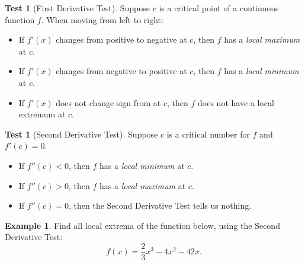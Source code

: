 \documentclass[oneside]{book}
\theoremstyle{definition}
\newtheorem{example}{Example}
\newtheorem{test}[definition]{Test}
\theoremstyle{solution}
\begin{document}
\begin{test}[First Derivative Test]
  Suppose $c$ is a critical point of a continuous function $f$. When
  moving from left to right:
  \begin{itemize}
  \item If $f'(x)$ changes from positive to negative at $c$, then $f$
    has a \emph{local maximum} at $c$.
  \item If $f'(x)$ changes from negative to positive at $c$, then $f$
    has a \emph{local minimum} at $c$.
  \item If $f'(x)$ does not change sign from at $c$, then $f$ does not
    have a local extremum at $c$.
  \end{itemize}
\end{test}



\begin{test}[Second Derivative Test]
  Suppose $c$ is a critical number for $f$ and $f'(c) = 0$.
  \begin{itemize}
  \item If $f''(c) < 0$, then $f$ has a \emph{local minimum} at $c$.
  \item If $f''(c) > 0$, then $f$ has a \emph{local maximum} at $c$.
  \item If $f''(c) = 0$, then the Second Derivative Test tells us
    nothing.
  \end{itemize}
\end{test}

\begin{example}
  Find all local extrema of the function below, using the Second
  Derivative Test:
$$ 
f(x)= \frac{2}{3}x^3 - 4x^2 - 42x.
$$  
\end{example}
\end{document}
